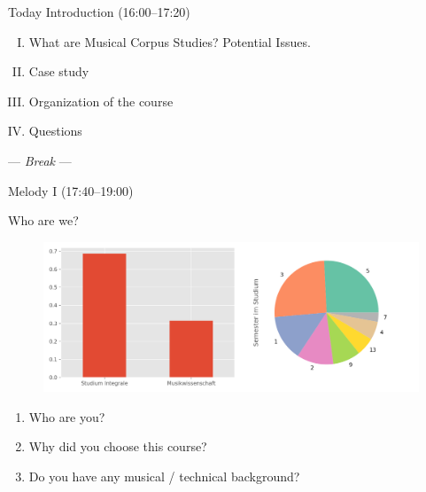 
\begin{frame}{Today}
  Introduction (16:00--17:20)
  \begin{enumerate}[I.]
    \item What are Musical Corpus Studies? Potential Issues.
    \item Case study
    \item Organization of the course
    \item Questions
  \end{enumerate}

  --- \textit{Break} ---

  Melody I (17:40--19:00)
\end{frame}

\begin{frame}{Who are we?}
  \begin{figure}
    \centering
    \includegraphics[width=.7\linewidth]{../../../src/basic_stats.png}
  \end{figure}

  \pause

  \begin{enumerate}
    \item Who are you?
    \item Why did you choose this course?
    \item Do you have any musical / technical background?
  \end{enumerate}
\end{frame}